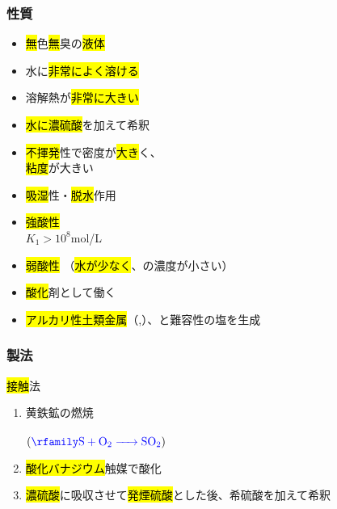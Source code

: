 \subsubsection{性質}
\begin{itemize}
      \item \hl{無}色\hl{無}臭の\hl{液体}
      \item 水に\hl{非常によく溶ける}
      \item 溶解熱が\hl{非常に大きい}
      \item \hl{水に濃硫酸}を加えて希釈
      \item \hl{不揮発}性で密度が\hl{大き}く、\\
      \hfill \hl{粘度}が大きい 
      \item \hl{吸湿}性・\hl{脱水}作用 
      \item \hl{強酸性} \\
            \hl{} \hfill $K_{1}>10^8$mol/L
      \item \hl{弱酸性}  （\hl{水が少なく}、\hl{}の濃度が小さい）
      \item \hl{酸化}剤として働く \\
      \item \hl{アルカリ性土類金属}（\hl{},\hl{}）、\hl{}と難容性の塩を生成 
\end{itemize}
\subsubsection{製法}
\begin{itembox}[l]{\hl{接触}法 \K}
      \begin{enumerate}
            \item 黄鉄鉱の燃焼\\
                  \\
                  $\left(\hce{S + O2 -> SO2}\right)$
            \item \hl{酸化バナジウム}触媒で酸化\\
            \item \hl{濃硫酸}に吸収させて\hl{発煙硫酸}とした後、希硫酸を加えて希釈\\
      \end{enumerate}
\end{itembox}

